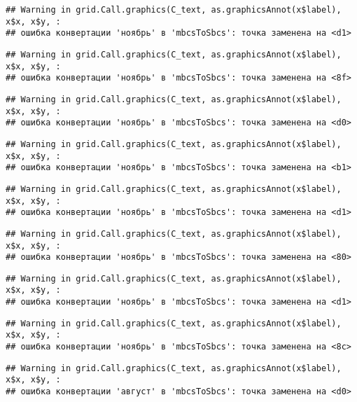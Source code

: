 \documentclass[
]{article}
\begin{document}
\begin{verbatim}
## Warning in grid.Call.graphics(C_text, as.graphicsAnnot(x$label), x$x, x$y, :
## ошибка конвертации 'ноябрь' в 'mbcsToSbcs': точка заменена на <d1>
\end{verbatim}

\begin{verbatim}
## Warning in grid.Call.graphics(C_text, as.graphicsAnnot(x$label), x$x, x$y, :
## ошибка конвертации 'ноябрь' в 'mbcsToSbcs': точка заменена на <8f>
\end{verbatim}

\begin{verbatim}
## Warning in grid.Call.graphics(C_text, as.graphicsAnnot(x$label), x$x, x$y, :
## ошибка конвертации 'ноябрь' в 'mbcsToSbcs': точка заменена на <d0>
\end{verbatim}

\begin{verbatim}
## Warning in grid.Call.graphics(C_text, as.graphicsAnnot(x$label), x$x, x$y, :
## ошибка конвертации 'ноябрь' в 'mbcsToSbcs': точка заменена на <b1>
\end{verbatim}

\begin{verbatim}
## Warning in grid.Call.graphics(C_text, as.graphicsAnnot(x$label), x$x, x$y, :
## ошибка конвертации 'ноябрь' в 'mbcsToSbcs': точка заменена на <d1>
\end{verbatim}

\begin{verbatim}
## Warning in grid.Call.graphics(C_text, as.graphicsAnnot(x$label), x$x, x$y, :
## ошибка конвертации 'ноябрь' в 'mbcsToSbcs': точка заменена на <80>
\end{verbatim}

\begin{verbatim}
## Warning in grid.Call.graphics(C_text, as.graphicsAnnot(x$label), x$x, x$y, :
## ошибка конвертации 'ноябрь' в 'mbcsToSbcs': точка заменена на <d1>
\end{verbatim}

\begin{verbatim}
## Warning in grid.Call.graphics(C_text, as.graphicsAnnot(x$label), x$x, x$y, :
## ошибка конвертации 'ноябрь' в 'mbcsToSbcs': точка заменена на <8c>
\end{verbatim}

\begin{verbatim}
## Warning in grid.Call.graphics(C_text, as.graphicsAnnot(x$label), x$x, x$y, :
## ошибка конвертации 'август' в 'mbcsToSbcs': точка заменена на <d0>
\end{verbatim}
\end{document}
